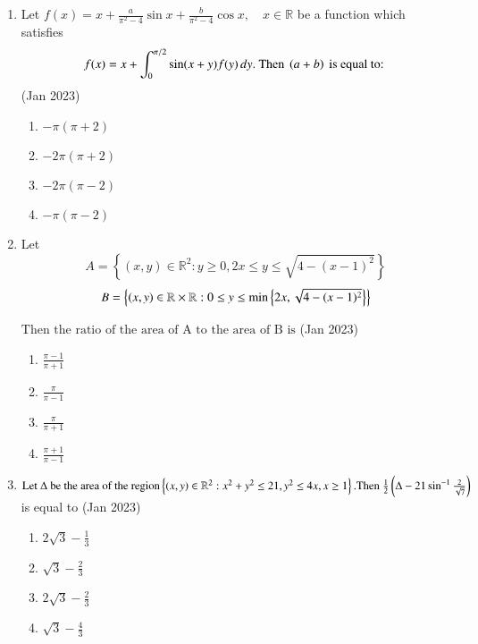 \documentclass[journal,12pt,onecolumn]{IEEEtran}
\theoremstyle{remark}
\begin{document}
\begin{enumerate}
\item 
Let 
$ f(x) = x + \frac{a}{\pi^2 - 4} \sin x + \frac{b}{\pi^2 - 4} \cos x, \quad x \in \mathbb{R} $ 
be a function which satisfies 
\begin{align*} 
f(x) = x + \int_0^{\pi/2} \sin(x + y) f(y) \, dy.  
\text{ Then }  \left(a + b\right) \text{ is equal to: }
\end{align*}\hfill(Jan 2023)
\begin{multicols}{4}
\begin{enumerate}
   \item $-\pi(\pi + 2) $
   \item $-2\pi(\pi + 2) $
   \item $-2\pi(\pi - 2) $
   \item $-\pi(\pi - 2) $
\end{enumerate}
\end{multicols}
\item Let \quad $$A = \left\{ (x, y) \in \mathbb{R}^2 : y \geq 0, 2x \leq y \leq \sqrt{4 - (x-1)^2} \right\}$$ $$B = \left\{ (x, y) \in \mathbb{R} \times \mathbb{R} : 0 \leq y \leq \min \left\{ 2x, \sqrt{4 - (x-1)^2} \right\}\right\}$$

$\text{Then the ratio of the area of A to the area of B is}$
\hfill(Jan 2023)
\begin{multicols}{2}
   \begin{enumerate}
       \item $ \frac{\pi - 1}{\pi + 1}$\\
     \item $ \frac{\pi}{\pi - 1}$
    \item $ \frac{\pi}{\pi + 1}$\\
     \item $ \frac{\pi + 1}{\pi - 1}$
   \end{enumerate}
\end{multicols}

\item $\text{Let } \Delta \text{ be the area of the region}
\left\{ (x, y) \in \mathbb{R}^2 : x^2 + y^2 \leq 21, y^2 \leq 4x, x \geq 1\right\}. \text{Then } \frac{1}{2} \left(\Delta - 21 \sin^{-1} \frac{2}{\sqrt{7}}\right)$ is equal to \hfill(Jan 2023)
\begin{multicols}{2}
\begin{enumerate}
    \item $2\sqrt{3} - \frac{1}{3}$\\
    \item $\sqrt{3} - \frac{2}{3}$
    \item $2\sqrt{3} - \frac{2}{3}$\\
    \item $\sqrt{3} - \frac{4}{3}$
\end{enumerate}
\end{multicols}


\end{enumerate}
\end{document}
